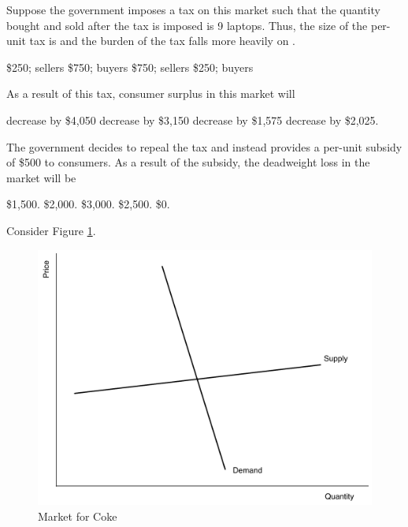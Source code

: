 \documentclass[addpoints,11pt]{exam}
\theoremstyle{definition}
\newcommand{\blank}[0]{\underline{\hspace{3cm}}}
\begin{document}
\begin{questions}
\question \label{q5} Suppose the government imposes a tax on this market such that the quantity bought and sold after the tax is imposed is 9 laptops. Thus, the size of the per-unit tax is \blank and the burden of the tax falls more heavily on \blank.

	\begin{choices}
		\choice \$250; sellers
		\choice \$750; buyers
		\choice \$750; sellers
		\CorrectChoice \$250; buyers
	\end{choices}

\question As a result of this tax, consumer surplus in this market will 

\begin{choices}
	\choice decrease by \$4,050
	\choice decrease by \$3,150
	\CorrectChoice decrease by \$1,575
	\choice decrease by \$2,025.
\end{choices}
	
\question \label{q6} The government decides to repeal the tax and instead provides a per-unit subsidy of \$500 to consumers. As a result of the subsidy, the deadweight loss in the market will be

\begin{choices}
	\CorrectChoice \$1,500.
	\choice \$2,000.
	\choice \$3,000.
	\choice \$2,500.
	\choice \$0.
\end{choices}
	

\newpage	
	
	\question Consider Figure \ref{MC19}. 
	
	\begin{figure}[H]
		\centering
		\includegraphics[scale=.40]{Exam1_MC19.pdf}
		\caption{Market for Coke}
		\label{MC19}
	\end{figure}
	

\end{questions}
\end{document}
